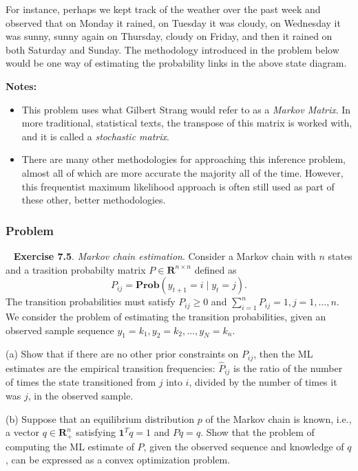 \documentclass[12pt,reqno]{article}
\theoremstyle{definition}
\numberwithin{equation}{section}
\begin{document}
For instance, perhaps we kept
track of the weather over the past week and observed that on Monday it rained, on Tuesday it was cloudy,
on Wednesday it was sunny, sunny again on Thursday, cloudy on Friday, and then it rained on both Saturday and
Sunday. The methodology introduced in the problem below would be one way of estimating the probability links
in the above state diagram.

\noindent \textbf{Notes:} 
\begin{itemize}
    \item This problem uses what Gilbert Strang would refer to as a \textit{Markov Matrix}. In 
    more traditional, statistical texts, the transpose of this matrix is worked with, and it is called a \textit{stochastic matrix}.
    \item There are many other methodologies for approaching this inference problem, almost all of which
    are more accurate the majority all of the time. However, this frequentist maximum likelihood approach is often still used as
    part of these other, better methodologies.
\end{itemize}


\subsubsection*{Problem}
~\cite{boyd_convex_optimization} \textbf{Exercise 7.5}. \textit{Markov chain estimation}. Consider a Markov chain
with $n$ states and a trasition probabilty matrix $P \in \mathbf{R}^{n \times n}$ defined as
\[P_{ij} = \mathbf{Prob}\left(y_{t+1} = i \mid y_t = j\right).\]
The transition probabilities must satisfy $P_{i j} \geq 0$ and $\sum_{i=1}^n P_{i j}=1, j=1, \ldots, n$. We consider the problem of estimating the transition probabilities,
given an observed sample sequence $y_1=k_1, y_2=k_2, \ldots, y_N=k_n$.

\vspace{0.1cm}
\noindent (a) Show that if there are no other prior constraints on $P_{i j}$, then the ML estimates are the empirical transition frequencies:
$\hat{P}_{i j}$ is the ratio of the number of times the state transitioned from $j$ into $i$, divided by the number of times it was $j$, in the observed sample.

\vspace{0.1cm}
\noindent (b) Suppose that an equilibrium distribution $p$ of the Markov chain is known, i.e., a vector $q \in \mathbf{R}_{+}^n$ satisfying $\mathbf{1}^T q=1$ and $P q=q$. Show that the problem of computing the ML estimate of $P$,
given the observed sequence and knowledge of $q$, can be expressed as a convex optimization problem.
\end{document}
